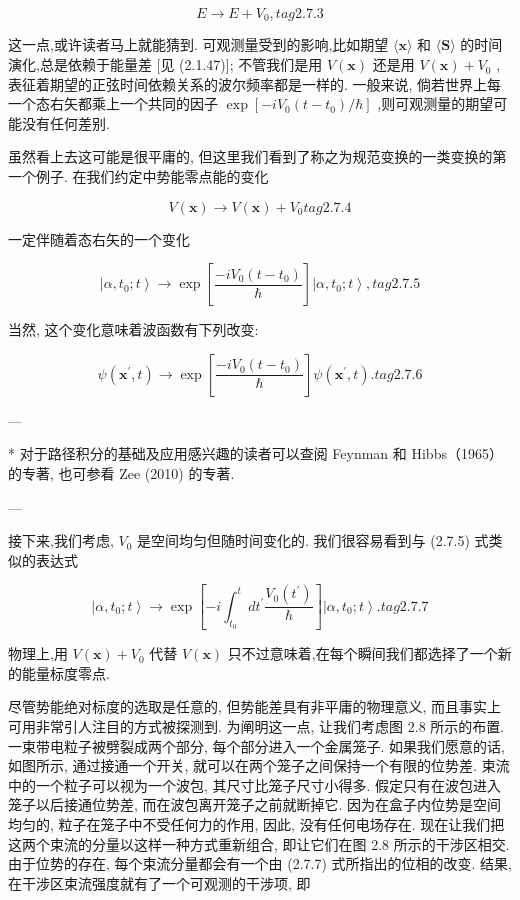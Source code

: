 \documentclass[lang=cn,newtx,10pt,scheme=chinese,thmcnt=section]{elegantbook}
\begin{document}
$$
E \rightarrow E + {V}_{0}, tag{2. 7.3}
$$

这一点,或许读者马上就能猜到. 可观测量受到的影响,比如期望 $\langle \mathbf{x}\rangle$ 和 $\langle \mathbf{S}\rangle$ 的时间演化,总是依赖于能量差 [见 (2.1.47)]; 不管我们是用 $V\left( \mathbf{x}\right)$ 还是用 $V\left( \mathbf{x}\right) + {V}_{0}$ ,表征着期望的正弦时间依赖关系的波尔频率都是一样的. 一般来说, 倘若世界上每一个态右矢都乘上一个共同的因子 $\exp \left\lbrack {-i{V}_{0}\left( {t - {t}_{0}}\right) /\hbar }\right\rbrack$ ,则可观测量的期望可能没有任何差别.

虽然看上去这可能是很平庸的, 但这里我们看到了称之为规范变换的一类变换的第一个例子. 在我们约定中势能零点能的变化

$$
V\left( \mathbf{x}\right) \rightarrow V\left( \mathbf{x}\right) + {V}_{0} tag{2. 7.4}
$$

一定伴随着态右矢的一个变化

$$
\left| {\alpha ,{t}_{0};t}\right\rangle \rightarrow \exp \left\lbrack \frac{-i{V}_{0}\left( {t - {t}_{0}}\right) }{\hbar }\right\rbrack \left| {\alpha ,{t}_{0};t}\right\rangle , tag{2.7.5}
$$

当然, 这个变化意味着波函数有下列改变:

$$
\psi \left( {{\mathbf{x}}^{\prime }, t}\right) \rightarrow \exp \left\lbrack \frac{-i{V}_{0}\left( {t - {t}_{0}}\right) }{\hbar }\right\rbrack \psi \left( {{\mathbf{x}}^{\prime }, t}\right) . tag{2.7.6}
$$

---

* 对于路径积分的基础及应用感兴趣的读者可以查阅 Feynman 和 Hibbs（1965）的专著, 也可参看 Zee (2010) 的专著.

---

接下来,我们考虑, ${V}_{0}$ 是空间均匀但随时间变化的. 我们很容易看到与 (2.7.5) 式类似的表达式

$$
\left| {\alpha ,{t}_{0};t}\right\rangle \rightarrow \exp \left\lbrack {-i{\int }_{{t}_{0}}^{t}d{t}^{\prime }\frac{{V}_{0}\left( {t}^{\prime }\right) }{\hbar }}\right\rbrack \left| {\alpha ,{t}_{0};t}\right\rangle . tag{2.7.7}
$$

物理上,用 $V\left( \mathbf{x}\right) + {V}_{0}$ 代替 $V\left( \mathbf{x}\right)$ 只不过意味着,在每个瞬间我们都选择了一个新的能量标度零点.

尽管势能绝对标度的选取是任意的, 但势能差具有非平庸的物理意义, 而且事实上可用非常引人注目的方式被探测到. 为阐明这一点, 让我们考虑图 2.8 所示的布置. 一束带电粒子被劈裂成两个部分, 每个部分进入一个金属笼子. 如果我们愿意的话, 如图所示, 通过接通一个开关, 就可以在两个笼子之间保持一个有限的位势差. 束流中的一个粒子可以视为一个波包, 其尺寸比笼子尺寸小得多. 假定只有在波包进入笼子以后接通位势差, 而在波包离开笼子之前就断掉它. 因为在盒子内位势是空间均匀的, 粒子在笼子中不受任何力的作用, 因此, 没有任何电场存在. 现在让我们把这两个束流的分量以这样一种方式重新组合, 即让它们在图 2.8 所示的干涉区相交. 由于位势的存在, 每个束流分量都会有一个由 (2.7.7) 式所指出的位相的改变. 结果, 在干涉区束流强度就有了一个可观测的干涉项, 即
\end{document}
